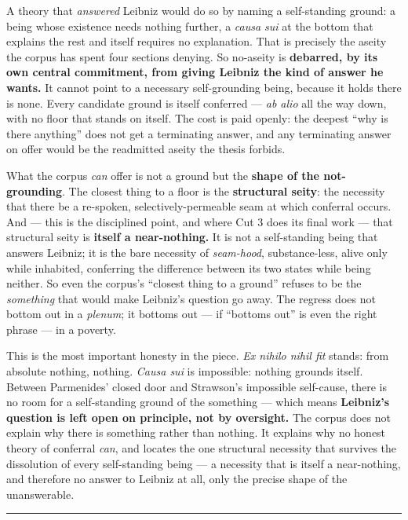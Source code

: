 \documentclass[11pt]{article}
\begin{document}
A theory that \emph{answered} Leibniz would do so by naming a self-standing ground: a being whose existence needs nothing further, a \emph{causa sui} at the bottom that explains the rest and itself requires no explanation. That is precisely the aseity the corpus has spent four sections denying. So no-aseity is \textbf{debarred, by its own central commitment, from giving Leibniz the kind of answer he wants.} It cannot point to a necessary self-grounding being, because it holds there is none. Every candidate ground is itself conferred — \emph{ab alio} all the way down, with no floor that stands on itself. The cost is paid openly: the deepest ``why is there anything'' does not get a terminating answer, and any terminating answer on offer would be the readmitted aseity the thesis forbids.

What the corpus \emph{can} offer is not a ground but the \textbf{shape of the not-grounding}. The closest thing to a floor is the \textbf{structural seity}: the necessity that there be a re-spoken, selectively-permeable seam at which conferral occurs. And — this is the disciplined point, and where Cut 3 does its final work — that structural seity is \textbf{itself a near-nothing.} It is not a self-standing being that answers Leibniz; it is the bare necessity of \emph{seam-hood}, substance-less, alive only while inhabited, conferring the difference between its two states while being neither. So even the corpus's ``closest thing to a ground'' refuses to be the \emph{something} that would make Leibniz's question go away. The regress does not bottom out in a \emph{plenum}; it bottoms out — if ``bottoms out'' is even the right phrase — in a poverty.

This is the most important honesty in the piece. \emph{Ex nihilo nihil fit} stands: from absolute nothing, nothing. \emph{Causa sui} is impossible: nothing grounds itself. Between Parmenides' closed door and Strawson's impossible self-cause, there is no room for a self-standing ground of the something — which means \textbf{Leibniz's question is left open on principle, not by oversight.} The corpus does not explain why there is something rather than nothing. It explains why no honest theory of conferral \emph{can}, and locates the one structural necessity that survives the dissolution of every self-standing being — a necessity that is itself a near-nothing, and therefore no answer to Leibniz at all, only the precise shape of the unanswerable.

\medskip\noindent\rule{\linewidth}{0.3pt}\medskip
\end{document}
